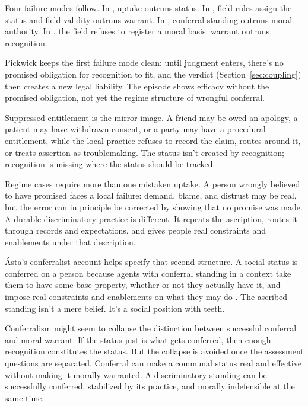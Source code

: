 \documentclass[12pt]{article}
\begin{document}
Four failure modes follow. In , uptake outruns status. In , field rules assign the status and field-validity outruns warrant. In , conferral standing outruns moral authority. In , the field refuses to register a moral basis: warrant outruns recognition.

Pickwick keeps the first failure mode clean: until judgment enters, there's no promised obligation for recognition to fit, and the verdict (Section~\ref{sec:coupling}) then creates a new legal liability. The episode shows efficacy without the promised obligation, not yet the regime structure of wrongful conferral.

Suppressed entitlement is the mirror image. A friend may be owed an apology, a patient may have withdrawn consent, or a party may have a procedural entitlement, while the local practice refuses to record the claim, routes around it, or treats assertion as troublemaking. The status isn't created by recognition; recognition is missing where the status should be tracked.

Regime cases require more than one mistaken uptake. A person wrongly believed to have promised faces a local failure: demand, blame, and distrust may be real, but the error can in principle be corrected by showing that no promise was made. A durable discriminatory practice is different. It repeats the ascription, routes it through records and expectations, and gives people real constraints and enablements under that description.

Ásta's conferralist account helps specify that second structure. A social status is conferred on a person because agents with conferral standing in a context take them to have some base property, whether or not they actually have it, and impose real constraints and enablements on what they may do \citep{asta2018Categories}. The ascribed standing isn't a mere belief. It's a social position with teeth.

Conferralism might seem to collapse the distinction between successful conferral and moral warrant. If the status just is what gets conferred, then enough recognition constitutes the status. But the collapse is avoided once the assessment questions are separated. Conferral can make a communal status real and effective without making it morally warranted. A discriminatory standing can be successfully conferred, stabilized by its practice, and morally indefensible at the same time.
\end{document}

